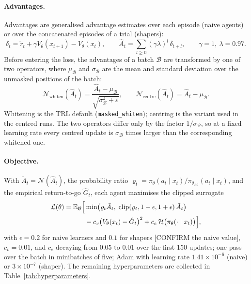 \paragraph{Advantages.}
Advantages are generalised advantage estimates over each episode
(naive agents) or over the concatenated episodes of a trial (shapers):
\begin{equation}
  \delta_t = \tilde{r}_t + \gamma V_{\theta}(x_{t+1}) - V_{\theta}(x_t),
  \qquad
  \hat{A}_t = \sum_{l \ge 0} (\gamma \lambda)^{l}\, \delta_{t+l},
  \qquad \gamma = 1,\ \lambda = 0.97 .
  \label{eq:gae}
\end{equation}
Before entering the loss, the advantages of a batch \(\mathcal{B}\) are
transformed by one of two operators, where \(\mu_{\mathcal{B}}\) and
\(\sigma_{\mathcal{B}}\) are the mean and standard deviation over the
unmasked positions of the batch:
\begin{equation}
  \mathcal{N}_{\mathrm{whiten}}(\hat{A}_t) = \frac{\hat{A}_t - \mu_{\mathcal{B}}}
  {\sqrt{\sigma_{\mathcal{B}}^2 + \varepsilon}},
  \qquad
  \mathcal{N}_{\mathrm{centre}}(\hat{A}_t) = \hat{A}_t - \mu_{\mathcal{B}} .
  \label{eq:norm}
\end{equation}
Whitening is the TRL default (\texttt{masked\_whiten}); centring is the
variant used in the centred runs.
The two operators differ only by the factor \(1/\sigma_{\mathcal{B}}\), so
at a fixed learning rate every centred update is \(\sigma_{\mathcal{B}}\)
times larger than the corresponding whitened one.

\paragraph{Objective.}
With \(\tilde{A}_t = \mathcal{N}(\hat{A}_t)\), the probability ratio
\(\varrho_t = \pi_{\theta}(a_t \mid x_t) / \pi_{\theta_{\mathrm{old}}}(a_t \mid x_t)\),
and the empirical return-to-go \(\hat{G}_t\), each agent maximises the
clipped surrogate
\begin{equation}
  \begin{aligned}
  \mathcal{L}(\theta) = \mathbb{E}_{\mathcal{B}}\Bigl[
    &\min\bigl(\varrho_t \tilde{A}_t,\;
    \operatorname{clip}(\varrho_t, 1 - \epsilon, 1 + \epsilon)\, \tilde{A}_t\bigr) \\
    &- c_v \bigl(V_{\theta}(x_t) - \hat{G}_t\bigr)^2
    + c_e\, \mathcal{H}\bigl(\pi_{\theta}(\cdot \mid x_t)\bigr)
  \Bigr],
  \end{aligned}
  \label{eq:ppo}
\end{equation}
with \(\epsilon = 0.2\) for naive learners and \(0.1\) for shapers
[CONFIRM the naive value], \(c_v = 0.01\), and \(c_e\) decaying from
\(0.05\) to \(0.01\) over the first 150 updates; one pass over the batch
in minibatches of five; Adam with learning rate \(1.41 \times 10^{-6}\)
(naive) or \(3 \times 10^{-7}\) (shaper).
The remaining hyperparameters are collected in
Table~\ref{tab:hyperparameters}.

